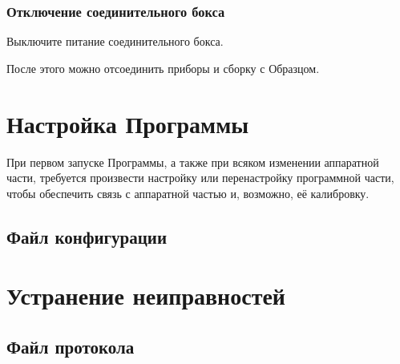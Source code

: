 \documentclass[12pt, a4paper, twocolumn]{report}
\begin{document}


\subsection{Отключение соединительного бокса}

Выключите питание соединительного бокса.

\bigskip

После этого можно отсоединить приборы и сборку с Образцом.

\chapter{Настройка Программы}

При первом запуске Программы, а также при всяком изменении аппаратной части, требуется произвести настройку или перенастройку программной части, чтобы обеспечить связь с аппаратной частью и, возможно, её калибровку.

\section{Файл конфигурации}



\chapter{Устранение неиправностей}

\section{Файл протокола}


\end{document}
